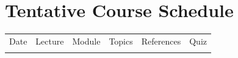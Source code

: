 \documentclass{./../Latex/syllabus}
\begin{document}
\section*{\centering Tentative Course Schedule} \vspace{1em}
{\renewcommand{\arraystretch}{1.5}
\begin{center}
\begin{tabularx}{1\textwidth}{|C{1.15cm}|C{1.2cm}|C{2.7cm}|X|p{3cm}|C{1.25cm}|}
\Xhline{1.75\arrayrulewidth}
Date & Lecture & Module & Topics  & References & Quiz  \\
\Xhline{1.75\arrayrulewidth}

\Xhline{0.75\arrayrulewidth}
\end{tabularx}
\end{center}
\restoregeometry 


%
%
%
%
%
%
}
\end{document}
